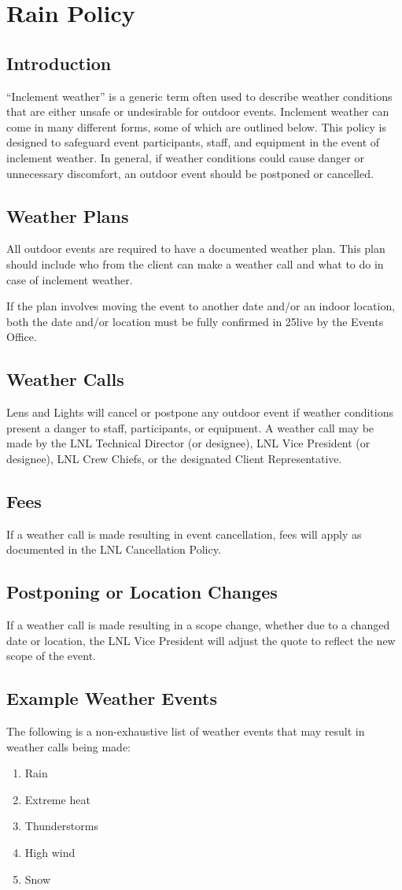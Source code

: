 \chapter{Rain Policy}

\section{Introduction}

``Inclement weather'' is a generic term often used to describe weather
conditions that are either unsafe or undesirable for outdoor events. Inclement
weather can come in many different forms, some of which are outlined below. This
policy is designed to safeguard event participants, staff, and equipment in the
event of inclement weather. In general, if weather conditions could cause danger
or unnecessary discomfort, an outdoor event should be postponed or cancelled.

\section{Weather Plans}
All outdoor events are required to have a documented weather plan. This plan
should include who from the client can make a weather call and what to do in
case of inclement weather.

If the plan involves moving the event to another date and/or an indoor location,
both the date and/or location must be fully confirmed in 25live by the Events
Office.

\section{Weather Calls}
Lens and Lights will cancel or postpone any outdoor event if weather conditions
present a danger to staff, participants, or equipment. A weather call may be
made by the LNL Technical Director (or designee), LNL Vice President (or
designee), LNL Crew Chiefs, or the designated Client Representative.

\section{Fees}
If a weather call is made resulting in event cancellation, fees will apply as
documented in the LNL Cancellation Policy.

\section{Postponing or Location Changes}
If a weather call is made resulting in a scope change, whether due to a changed
date or location, the LNL Vice President will adjust the quote to reflect the
new scope of the event.

\section{Example Weather Events}
The following is a non-exhaustive list of weather events that may result in
weather calls being made:
\begin{enumerate}
    \item Rain 
    \item Extreme heat
    \item Thunderstorms
    \item High wind
    \item Snow
\end{enumerate}
